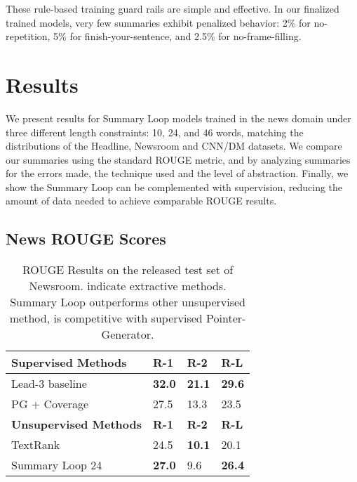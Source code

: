\documentclass[11pt,a4paper]{article}
\begin{document}
These rule-based training guard rails are simple and effective. In our finalized trained models, very few summaries exhibit penalized behavior: 2\% for no-repetition, 5\% for finish-your-sentence, and 2.5\% for no-frame-filling.

\section{Results}
\label{section:results}
We present results for Summary Loop models trained in the news domain under three different length constraints: 10, 24, and 46 words, matching the distributions of the Headline, Newsroom \cite{grusky2018newsroom} and CNN/DM \cite{nallapati2016abstractive} datasets. We compare our summaries using the standard ROUGE metric, and by analyzing summaries for the errors made, the technique used and the level of abstraction. Finally, we show the Summary Loop can be complemented with supervision, reducing the amount of data needed to achieve comparable ROUGE results.

\subsection{News ROUGE Scores}

\begin{table}[]
    \begin{tabular}{llll}
    \hline
    \textbf{Supervised Methods}   & \textbf{R-1} & \textbf{R-2} & \textbf{R-L} \\ \hline
     Lead-3 baseline             & \textbf{32.0}        & \textbf{21.1}        & \textbf{29.6}        \\
    PG + Coverage                 & 27.5        & 13.3        & 23.5        \\ \hline
    \textbf{Unsupervised Methods} & \textbf{R-1} & \textbf{R-2} & \textbf{R-L} \\ \hline
     TextRank                    & 24.5        & \textbf{10.1}        & 20.1        \\
    Summary Loop 24 & \textbf{27.0}        & 9.6         & \textbf{26.4}        \\ \hline
    \end{tabular}
    \caption{ROUGE Results on the released test set of Newsroom.  indicate extractive methods. Summary Loop outperforms other unsupervised method, is competitive with supervised Pointer-Generator.}
    \label{table:newsroom_rouge}
\end{table}
\end{document}
